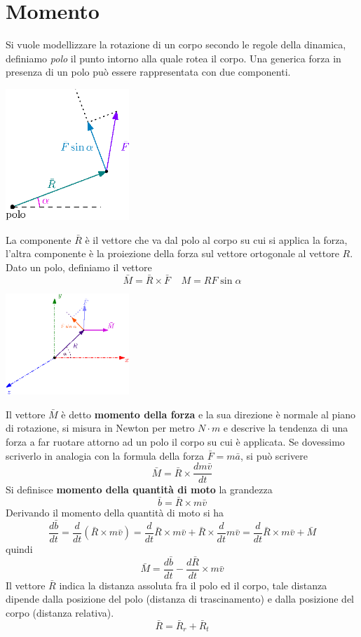 \documentclass[10pt, letterpaper]{report}
\begin{document}
\flowerLine 
\section{Momento}
Si vuole modellizzare la rotazione di un corpo secondo le 
regole della dinamica, definiamo \textit{polo} il punto 
intorno alla quale rotea il corpo. Una generica forza in presenza di un 
polo può essere rappresentata con due componenti.\begin{center}
    \includegraphics[width=0.35\textwidth]{images/momento1.eps}
\end{center}
La componente $\bar R$ è il vettore che va dal polo al corpo su cui 
si applica la forza, l'altra componente è la proiezione 
della forza sul vettore ortogonale al vettore $R$.
Dato un polo, definiamo il vettore 
$$ \bar M = \bar R \times \bar F \ \ \ \  \ M=RF\sin\alpha$$
\begin{center}
    \includegraphics[width=0.35\textwidth]{images/momentoAngolare.eps}
\end{center}
Il vettore $\bar M$ è detto \textbf{momento della forza} e la sua direzione è 
normale al piano di rotazione, si misura in Newton per metro $N\cdot m$ e descrive la tendenza di una forza a far ruotare attorno ad un polo il corpo su cui è applicata.
Se dovessimo scriverlo in analogia con la formula della forza $\bar F = m\bar a$, si 
può scrivere 
$$ \bar M = \bar R \times \frac{d m\bar v}{dt}$$
Si definisce \textbf{momento della quantità di moto } la grandezza 
$$ \bar b = \bar R\times m\bar v$$
Derivando il momento della quantità di moto si ha 
$$\frac{d\bar b}{dt}=\frac{d}{dt}(\bar R \times m\bar v)=
\frac{d}{dt}\bar R \times m\bar v + \bar R \times \frac{d}{dt}m\bar v = 
\frac{d}{dt}\bar R \times m\bar v + \bar M $$
quindi 
$$\bar M=\frac{d\bar b}{dt}-\frac{d\bar R}{dt}\times m \bar v$$ 
Il vettore $\bar R$ indica la distanza assoluta fra il polo ed il corpo, tale distanza dipende 
dalla posizione del polo (distanza di trascinamento) e dalla posizione del corpo (distanza relativa).
$$ \bar R = \bar R_r + \bar R_t$$
\end{document}
